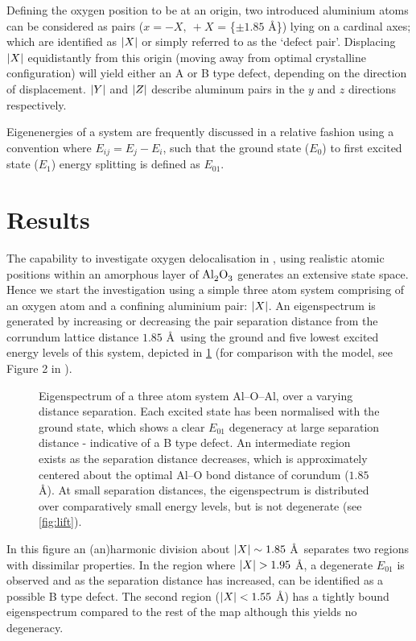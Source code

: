 Defining the oxygen position to be at an origin, two introduced aluminium atoms can be considered as pairs ($x = -X, \: +X$ = \{$\pm 1.85$ \AA\}) lying on a cardinal axes; which are identified as $\lvert X\rvert$ or simply referred to as the `defect pair'.
Displacing $\lvert X\rvert$ equidistantly from this origin (\ie moving away from optimal crystalline configuration) will yield either an A or B type defect, depending on the direction of displacement.
$\lvert Y\rvert$ and $\lvert Z\rvert$ describe aluminum pairs in the $y$ and $z$ directions respectively.

Eigenenergies of a system are frequently discussed in a relative fashion using a convention where $E_{ij} = E_j-E_i$, such that the ground state ($E_0$) to first excited state ($E_1$) energy splitting is defined as $E_{01}$.

\section{Results}

The capability to investigate oxygen delocalisation in , using realistic atomic positions within an amorphous layer of $\ce{Al_2O_3}$ generates an extensive state space.
Hence we start the investigation using a simple three atom system comprising of an oxygen atom and a confining aluminium pair: $\lvert X\rvert$.
An eigenspectrum is generated by increasing or decreasing the pair separation distance from the corrundum lattice distance $1.85$ \AA\ using the ground and five lowest excited energy levels of this system, depicted in \cref{fig:spect3d} (for comparison with the  model, see Figure 2 in ).

\begin{figure}[htp]
  \resizebox{0.9\textwidth}{!}{}
  \caption[Eigenspectrum]{\label{fig:spect3d}Eigenspectrum of a three atom system Al--O--Al, over a varying distance separation. Each excited state has been normalised with the ground state, which shows a clear $E_{01}$ degeneracy at large separation distance - indicative of a B type defect. An intermediate region exists as the separation distance decreases, which is approximately centered about the optimal Al--O bond distance of corundum ($1.85$ \AA). At small separation distances, the eigenspectrum is distributed over comparatively small energy levels, but is not degenerate (see \cref{fig:lift}).}
\end{figure}

In this figure an (an)harmonic division about $\lvert X\rvert \sim 1.85$ \AA\ separates two regions with dissimilar properties.
In the region where $\lvert X\rvert > 1.95$ \AA, a degenerate $E_{01}$ is observed and as the separation distance has increased, can be identified as a possible B type defect.
The second region ($\lvert X\rvert < 1.55$ \AA) has a tightly bound eigenspectrum compared to the rest of the map although this yields no degeneracy.

